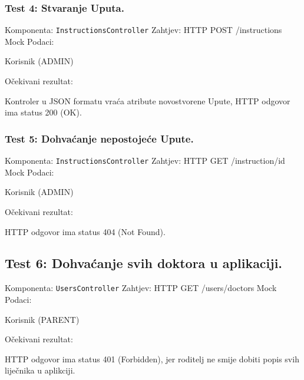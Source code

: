 			\subsubsection*{Test 4: Stvaranje Uputa.}
			Komponenta: \lstinline[language=Java]{InstructionsController} \newline
			Zahtjev: HTTP POST /instructions \newline
			Mock Podaci:
			\begin{packed_item}
				\item Korisnik (ADMIN)
			\end{packed_item}
			Očekivani rezultat:
			\begin{packed_item}
				\item Kontroler u JSON formatu vraća atribute novostvorene Upute, HTTP odgovor ima status 200 (OK).
			\end{packed_item}

			\subsubsection*{Test 5: Dohvaćanje nepostojeće Upute.}
			Komponenta: \lstinline[language=Java]{InstructionsController} \newline
			Zahtjev: HTTP GET /instruction/{id} \newline
			Mock Podaci:
			\begin{packed_item}
				\item Korisnik (ADMIN)
			\end{packed_item}
			Očekivani rezultat:
			\begin{packed_item}
				\item HTTP odgovor ima status 404 (Not Found).
			\end{packed_item}

			\subsection*{Test 6: Dohvaćanje svih doktora u aplikaciji.}
			Komponenta: \lstinline[language=Java]{UsersController} \newline
			Zahtjev: HTTP GET /users/doctors \newline
			Mock Podaci:
			\begin{packed_item}
				\item Korisnik (PARENT)
			\end{packed_item}
			Očekivani rezultat:
			\begin{packed_item}
				\item HTTP odgovor ima status 401 (Forbidden), jer roditelj ne smije dobiti popis svih liječnika u aplikciji.
			\end{packed_item}
			
